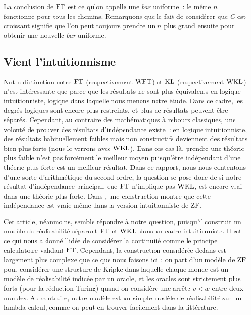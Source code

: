 \documentclass{article}
\begin{document}
La conclusion de $\mathrm{FT}$ est ce qu'on appelle une \textit{bar} uniforme~: le même $n$ fonctionne pour tous les chemins. Remarquons que le fait de considérer que $C$ est croissant signifie que l'on peut toujours prendre un $n$ plus grand ensuite pour obtenir une nouvelle \textit{bar} uniforme.

\subsection{Vient l'intuitionnisme}

Notre distinction entre $\mathrm{FT}$ (respectivement $\mathrm{WFT}$) et $\mathrm{KL}$ (respectivement $\mathrm{WKL}$) n'est intéressante que parce que les résultats ne sont plus équivalents en logique intuitionniste, logique dans laquelle nous menons notre étude. Dans ce cadre, les degrés logiques sont encore plus restreints, et plus de résultats peuvent être séparés. Cependant, au contraire des mathématiques à rebours classiques, une volonté de prouver des résultats d'indépendance existe~: en logique intuitionniste, des résultats habituellement faibles mais non constructifs deviennent des résultats bien plus forts (nous le verrons avec $\mathrm{WKL}$). Dans ces cas-là, prendre une théorie plus faible n'est pas forcément le meilleur moyen puisqu'être indépendant d'une théorie plus forte est un meilleur résultat. Dans ce rapport, nous nous contentons d'une sorte d'arithmétique du second ordre, la question se pose donc de si notre résultat d'indépendance principal, que $\mathrm{FT}$ n'implique pas $\mathrm{WKL}$, est encore vrai dans une théorie plus forte. Dans \cite{lubarsky2015realizabilitymodelsseparatingvarious}, une construction montre que cette indépendance est vraie même dans la version intuitionniste de $\mathrm{ZF}$.

Cet article, néanmoins, semble répondre à notre question, puisqu'il construit un modèle de réalisabilité séparant $\mathrm{FT}$ et $\mathrm{WKL}$ dans un cadre intuitionniste. Il est ce qui nous a donné l'idée de considérer la continuité comme le principe calculatoire validant $\mathrm{FT}$. Cependant, la construction considérée dedans est largement plus complexe que ce que nous faisons ici~: on part d'un modèle de $\mathrm{ZF}$ pour considérer une structure de Kripke dans laquelle chaque monde est un modèle de réalisabilité indicée par un oracle, et les oracles sont strictement plus forts (pour la réduction Turing) quand on considère une arrête $v < w$ entre deux mondes. Au contraire, notre modèle est un simple modèle de réalisabilité sur un lambda-calcul, comme on peut en trouver facilement dans la littérature.
\end{document}

